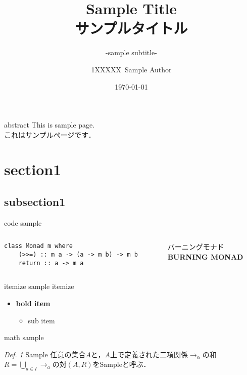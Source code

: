 \documentclass[aspectratio=1610,14pt]{beamer}
\title{%
    Sample Title \\
    サンプルタイトル
}
\subtitle{
    -sample subtitle-
}
\author{%
    1XXXXX\ Sample Author
}
\institute[Sample Univ.]{%
    Sample Univ. 
}
\date{%
    \today
}
\begin{document}
%
%
\begin{frame}
\maketitle 
\end{frame}
\begin{frame}[fragile]{abstract}
This is sample page.\\[4pt] 
これはサンプルページです．
\end{frame}

\section{section1}
\subsection{subsection1}

\begin{frame}
    \tableofcontents[currentsection]
\end{frame}

\begin{frame}[fragile]{code sample}
    \begin{columns}
        \begin{column}{0.5\textwidth}
            \begin{lstlisting}
class Monad m where 
    (>>=) :: m a -> (a -> m b) -> m b 
    return :: a -> m a
            \end{lstlisting}
        \end{column}
        \begin{column}{0.5\textwidth}
            バーニングモナド \\
            \textbf{BURNING MONAD}
        \end{column}
    \end{columns}
\end{frame}

\begin{frame}{itemize sample}
    itemize
    \begin{itemize}
        \item \textbf{bold item}
        \begin{itemize}
            \item sub item
        \end{itemize}
    \end{itemize}
\end{frame}

\begin{frame}{math sample}
    \begin{block}{\textit{Def. 1} Sample}
        任意の集合$A$と，$A$上で定義された二項関係$\to_{\alpha}$の和$R = \bigcup_{a \in I} \to_a $の対$(A, R)$をSampleと呼ぶ．
    \end{block}
\end{frame}
\end{document}
